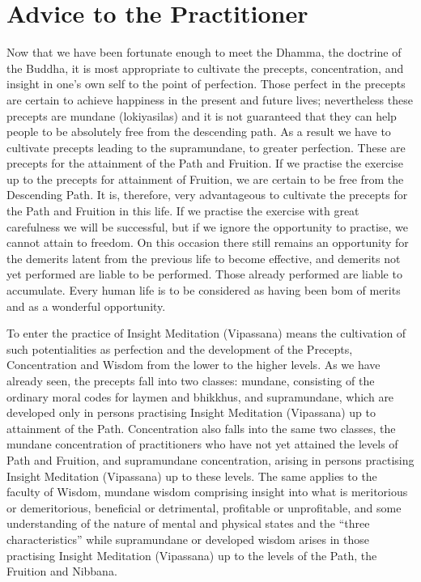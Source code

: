 \documentclass[a5paper,10pt,english]{book}
\begin{document}
\section{Advice to the Practitioner}
\label{\detokenize{path:advice-to-the-practitioner}}
\sphinxAtStartPar
Now that we have been fortunate enough to meet the Dhamma, the doctrine of the Buddha, it is most appropriate to cultivate the precepts, concentration, and insight in one’s own self to the point of perfection. Those perfect in the precepts are certain to achieve happiness in the present and future lives; nevertheless these precepts are mundane (lokiya\sphinxhyphen{}silas) and it is not guaranteed that they can help people to be absolutely free from the descending path. As a result we have to cultivate precepts leading to the supra\sphinxhyphen{}mundane, to greater perfection. These are precepts for the attainment of the Path and Fruition. If we practise the exercise up to the precepts for attainment of Fruition, we are certain to be free from the Descending Path. It is, therefore, very advantageous to cultivate the precepts for the Path and Fruition in this life. If we practise the exercise with great carefulness we will be successful, but if we ignore the opportunity to practise, we cannot attain to freedom. On this occasion there still remains an opportunity for the demerits latent from the previous life to become effective, and demerits not yet performed are liable to be performed. Those already performed are liable to accumulate. Every human life is to be considered as having been bom of merits and as a wonderful opportunity.

\sphinxAtStartPar
To enter the practice of Insight Meditation (Vipassana) means the cultivation of such potentialities as perfection and the development of the Precepts, Concentration and Wisdom from the lower to the higher levels. As we have already seen, the precepts fall into two classes: mundane, consisting of the ordinary moral codes for laymen and bhikkhus, and supra\sphinxhyphen{}mundane, which are developed only in persons practising Insight Meditation (Vipassana) up to attainment of the Path. Concentration also falls into the same two classes, the mundane concentration of practitioners who have not yet attained the levels of Path and Fruition, and supra\sphinxhyphen{}mundane concentration, arising in persons practising Insight Meditation (Vipassana) up to these levels. The same applies to the faculty of Wisdom, mundane wisdom comprising insight into what is meritorious or demeritorious, beneficial or detrimental, profitable or unprofitable, and some understanding of the nature of mental and physical states and the “three characteristics” while supra\sphinxhyphen{}mundane or developed wisdom arises in those practising Insight Meditation (Vipassana) up to the levels of the Path, the Fruition and Nibbana.
\end{document}
